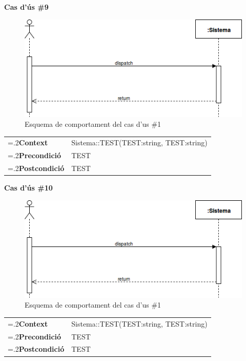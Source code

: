 \clearpage
\noindent\textbf{\large Cas d'ús \#9}\\
\begin{figure}[H]
\centering
\includegraphics[scale=0.6]{Figures/casdus_00.png}
\caption{Esquema de comportament del cas d'us \#1}
\end{figure}
\begin{table}[h]
\noindent
\begin{tabularx}{\linewidth}{
>{\hsize=.2\hsize}X%
>{\hsize=0.8\hsize}X%
}
\textbf{Context} 		& Sistema::TEST(TEST:string, TEST:string) \\
\textbf{Precondició} 	& TEST \\
\textbf{Postcondició}	& TEST \\
\end{tabularx}
\label{}
\end{table}

\noindent\textbf{\large Cas d'ús \#10}\\
\begin{figure}[H]
\centering
\includegraphics[scale=0.6]{Figures/casdus_00.png}
\caption{Esquema de comportament del cas d'us \#1}
\end{figure}
\begin{table}[h]
\noindent
\begin{tabularx}{\linewidth}{
>{\hsize=.2\hsize}X%
>{\hsize=0.8\hsize}X%
}
\textbf{Context} 		& Sistema::TEST(TEST:string, TEST:string) \\
\textbf{Precondició} 	& TEST \\
\textbf{Postcondició}	& TEST \\
\end{tabularx}
\label{}
\end{table}

